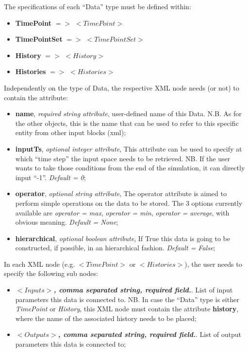 The specifications of each ``Data'' type must be defined within:
\begin{itemize}
   \item \textbf{TimePoint} $=>$ $<TimePoint>$
   \item \textbf{TimePointSet} $=>$ $<TimePointSet>$
   \item \textbf{History} $=>$ $<History>$
   \item \textbf{Histories} $=>$ $<Histories>$
\end{itemize}
Independently on the type of Data, the respective XML node needs (or not) to contain the attribute:
\vspace{-5mm}
\begin{itemize}
\itemsep0em
\item \textbf{name}, \textit{required string attribute}, user-defined name of this Data. N.B. As for the other objects, this is the name that can be used to refer to this specific entity from other input blocks (xml);
\item \textbf{inputTs}, \textit{optional integer attribute}, This attribute can be used to specify at which ``time step'' the input space needs to be retrieved. NB. If the user wants to take those conditions from the end of the simulation, it can directly input ``-1''. \textit{Default = 0};
\item \textbf{operator}, \textit{optional string attribute}, The operator attribute is aimed to perform simple operations on the data to be stored. The 3 options currently available are \textit{operator = max}, \textit{operator = min}, \textit{operator = average}, with obvious meaning. \textit{Default = None};
\item \textbf{hierarchical}, \textit{optional boolean attribute}, If True this data is going to be constructed, if possible, in an hierarchical fashion. \textit{Default = False};
\end{itemize}
\vspace{-5mm}
In each XML node (e.g. $<TimePoint>$ or $<Histories>$), the user needs to specify the following sub nodes:
\begin{itemize}
 \item $<Inputs>$\textbf{\textit{, comma separated string, required field.}}.  List of input parameters this data is connected to. NB. In case the ``Data'' type is either \textit{TimePoint} or  \textit{History}, this XML node must contain the attribute \textbf{history}, where the name of the associated history needs to be placed;
 \item $<Outputs>$\textbf{\textit{, comma separated string, required field.}}.  List of output parameters this data is connected to;
\end{itemize}

